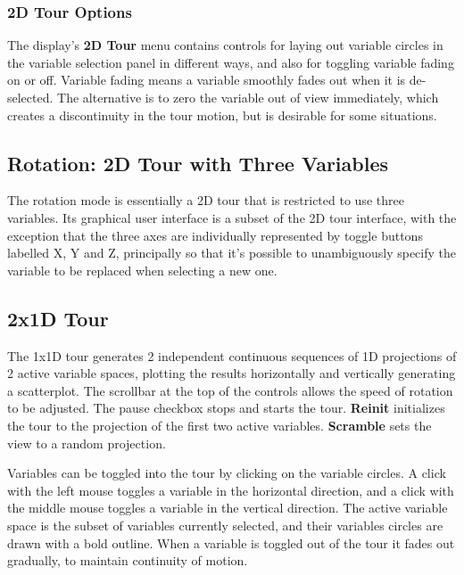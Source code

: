 \documentclass[11pt]{article}
\def\Widget#1{\textbf{#1}}
\begin{document}
\subsubsection{2D Tour Options}

The display's \Widget{2D Tour} menu contains controls for laying out
variable circles in the variable selection panel in different ways,
and also for toggling variable fading on or off. Variable fading means
a variable smoothly fades out when it is de-selected. The alternative
is to zero the variable out of view immediately, which creates a
discontinuity in the tour motion, but is desirable for some
situations.

\subsection{Rotation: 2D Tour with Three Variables}
\label{slbl:Rotation}

The rotation mode is essentially a 2D tour that is restricted to use
three variables.  Its graphical user interface is a subset of the 2D
tour interface, with the exception that the three axes are
individually represented by toggle buttons labelled X,
Y and Z, principally so that it's possible to
unambiguously specify the variable to be replaced when selecting a new
one.

\subsection{2x1D Tour}
\label{slbl:2x1DTour}

The 1x1D tour generates 2 independent continuous sequences of 1D
projections of 2 active variable spaces, plotting the results
horizontally and vertically generating a scatterplot. The scrollbar at
the top of the controls allows the speed of rotation to be
adjusted. The pause checkbox stops and starts the tour. \Widget{Reinit}
initializes the tour to the projection of the first two active
variables. \Widget{Scramble} sets the view to a random projection.

Variables can be toggled into the tour by clicking on the variable
circles. A click with the left mouse toggles a variable in the horizontal
direction, and a click with the middle mouse toggles a variable in
the vertical direction. The active variable space is the subset of
variables currently selected, and their variables circles are drawn with
a bold outline. When a variable is toggled out of the tour it fades out
gradually, to maintain continuity of motion.
\end{document}
